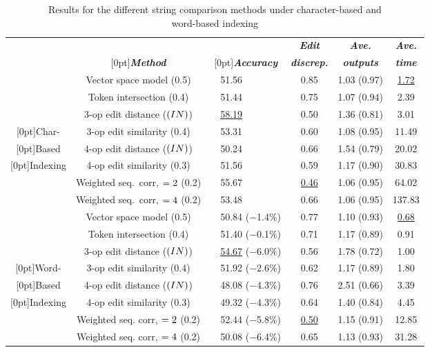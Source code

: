 \begin{table*}[htbp]
  \begin{center}
    \small
    \begin{tabular}{|c|c|cl|c|c|c|}
      \cline{2-7}
      \multicolumn{1}{c|}{} & & \multicolumn{2}{c|}{}
      & {\bf \it Edit} & {\bf \it Ave.} & {\bf \it Ave.} \\
      \multicolumn{1}{c|}{} & \raisebox{1.5ex}[0pt]{{\bf \it Method}} &
      \multicolumn{2}{c|}{\raisebox{1.5ex}[0pt]{{\bf \it Accuracy}}}

      & {\bf \it discrep.} & {\bf \it outputs} & {\bf \it time} \\
      \hline
      & Vector space model (0.5) & & 51.56 & 0.85 & 1.03 (0.97) & \ul{1.72} \\
      & Token intersection (0.4) & & 51.44 & 0.75 & 1.07 (0.94) & 2.39 \\
      \cline{2-7}
      & 3-op edit distance ($(IN)$) & & \ul{58.19} & 0.50 & 1.36 (0.81) & 3.01 \\
      \raisebox{1.5ex}[0pt]{{\sc Char-}} & 3-op edit similarity (0.4) & & 53.31 & 0.60 & 1.08 (0.95) & 11.49 \\
      \raisebox{1.5ex}[0pt]{{\sc Based}} & 4-op edit distance ($(IN)$) & & 50.24 & 0.66 & 1.54 (0.79) & 20.02 \\
      \raisebox{1.5ex}[0pt]{{\sc Indexing}} & 4-op edit similarity (0.3) & & 51.56 & 0.59 & 1.17 (0.90) & 30.83 \\
      & Weighted seq.\ corr, $=2$ (0.2) & & 55.67 & \ul{0.46} & 1.06 (0.95) & 64.02 \\
      & Weighted seq.\ corr, $=4$  (0.2) & & 53.48 & 0.66 & 1.06 (0.95) & 137.83 \\
      \hline\hline
      & Vector space model (0.5) & & 50.84 ($-$1.4\%) & 0.77 & 1.10 (0.93) & \ul{0.68} \\
      & Token intersection (0.4) & & 51.40 ($-$0.1\%) & 0.71 & 1.17 (0.89) & 0.91 \\
      \cline{2-7}
      & 3-op edit distance ($(IN)$) & & \ul{54.67} ($-$6.0\%) & 0.56 & 1.78 (0.72) & 1.00 \\
      \raisebox{1.5ex}[0pt]{{\sc Word-}} & 3-op edit similarity (0.4) & & 51.92 ($-$2.6\%) & 0.62 & 1.17 (0.89) & 1.80 \\
      \raisebox{1.5ex}[0pt]{{\sc Based}} & 4-op edit distance ($(IN)$) & & 48.08 ($-$4.3\%) & 0.76 & 2.51 (0.66) & 3.39 \\
      \raisebox{1.5ex}[0pt]{{\sc Indexing}} & 4-op edit similarity (0.3) & & 49.32 ($-$4.3\%) & 0.64 & 1.40 (0.84) & 4.45 \\
      & Weighted seq. corr, $=2$  (0.2) & & 52.44 ($-$5.8\%) & \ul{0.50} & 1.15 (0.91) & 12.85 \\
      & Weighted seq. corr, $=4$  (0.2) & & 50.08 ($-$6.4\%) & 0.65
      & 1.13 (0.93) & 31.28 \\
      \hline
    \end{tabular}
  \end{center}
    \caption{Results for the different string comparison methods under 
      character-based and\\ word-based indexing}
    \label{tab:results1}
\end{table*}
